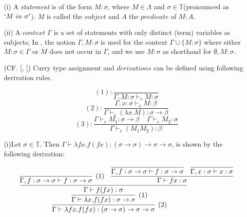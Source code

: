 \begin{def1}
\normalfont (i) A \textit{statement} is of the form $M : \sigma$, where $M\in \Lambda$ and $\sigma \in \mathbb{T}$(pronounced as $`M\ in\ \sigma'$). $M$ is called the $subject$ and $A$ the $predicate$ of $M : A$.  
\end{def1}
(ii) A $context$ $\Gamma$ is a set of statements with only distinct (term) variables as subjects; In \cite{svb2001type}, the notion $\Gamma,M:\sigma$ is used for the context $\Gamma \cup \{M:\sigma\}$ where either $M:\sigma \in \Gamma$ or $M$ does not occur in $\Gamma$, and we use $M:\sigma$ as shorthand for $\emptyset,M:\sigma$.


\begin{def1}
\normalfont (CF. [\cite{curry1934functionality}, \cite{curry1972combinatory}]) Curry type assignment and $derivations$ can be defined using following derivation rules.  
\end{def1}

\begin{equation*}
(1):\frac{}{\Gamma ,M:\sigma \vdash _cM:\sigma} 
\end{equation*}
\begin{equation*}
(2):\frac{\Gamma ,x:\sigma \vdash _cM:\beta}{\Gamma \vdash _c(\lambda x.M):\sigma \rightarrow \beta} 
\end{equation*}
\begin{equation*}
(3):\frac{\Gamma \vdash _cM_1:\sigma \rightarrow \beta\ \ \ \ \ \Gamma \vdash _cM_2:\sigma}{\Gamma \vdash _c(M_1M_2):\beta} 
\end{equation*}

\begin{exmp}
\normalfont (i)Let $\sigma \in \mathbb{T}$. Then $\Gamma \vdash \lambda fx.f(fx):(\sigma \rightarrow \sigma)\rightarrow \sigma \rightarrow \sigma$, is shown by the following derivation:
\end{exmp}

$$
\infer[(2)]{\Gamma \vdash \lambda fx.f(fx):(\sigma \rightarrow \sigma)\rightarrow \sigma \rightarrow \sigma}{
	\infer[(1)]{\Gamma \vdash \lambda x.f(fx):\sigma \rightarrow \sigma}{
      \infer{\Gamma \vdash f(fx):\sigma}{
             \infer[(1)]{\Gamma,f:\sigma \rightarrow \sigma \vdash f:\sigma \rightarrow \sigma}{}
             & 
             \infer{\Gamma \vdash fx:\sigma}{
                \infer{\Gamma,f:\sigma \rightarrow \sigma \vdash f:\sigma \rightarrow \sigma}{}
                &
                \infer{\Gamma,x:\sigma \vdash x:\sigma}{}
             }
         }
      }		
	}
$$


